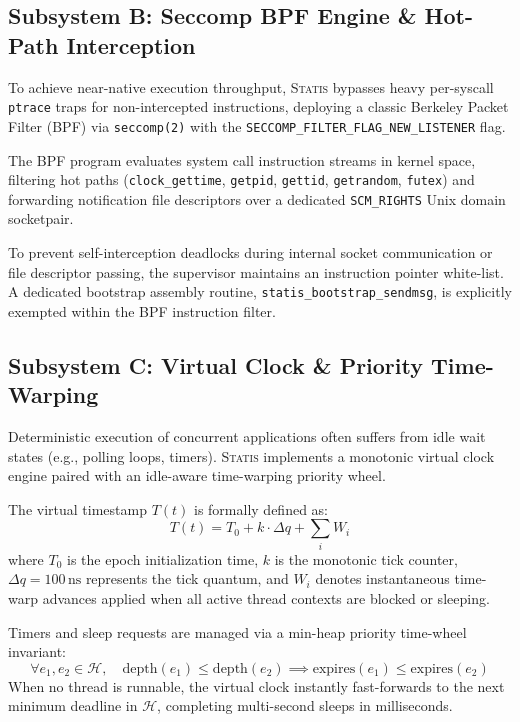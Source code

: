 \documentclass[twocolumn,10pt,sigconf,nonacm]{acmart}
\begin{document}
\subsection{Subsystem B: Seccomp BPF Engine \& Hot-Path Interception}
To achieve near-native execution throughput, \textsc{Statis} bypasses heavy per-syscall \texttt{ptrace} traps for non-intercepted instructions, deploying a classic Berkeley Packet Filter (BPF) via \texttt{seccomp(2)} with the \texttt{SECCOMP\_FILTER\_FLAG\_NEW\_LISTENER} flag.

The BPF program evaluates system call instruction streams in kernel space, filtering hot paths (\texttt{clock\_gettime}, \texttt{getpid}, \texttt{gettid}, \texttt{getrandom}, \texttt{futex}) and forwarding notification file descriptors over a dedicated \texttt{SCM\_RIGHTS} Unix domain socketpair. 

To prevent self-interception deadlocks during internal socket communication or file descriptor passing, the supervisor maintains an instruction pointer white-list. A dedicated bootstrap assembly routine, \texttt{statis\_bootstrap\_sendmsg}, is explicitly exempted within the BPF instruction filter.

\subsection{Subsystem C: Virtual Clock \& Priority Time-Warping}
Deterministic execution of concurrent applications often suffers from idle wait states (e.g., polling loops, timers). \textsc{Statis} implements a monotonic virtual clock engine paired with an idle-aware time-warping priority wheel.

The virtual timestamp $T(t)$ is formally defined as:
\begin{equation}
T(t) = T_0 + k \cdot \Delta q + \sum_{i} W_i
\end{equation}
where $T_0$ is the epoch initialization time, $k$ is the monotonic tick counter, $\Delta q = 100\,\text{ns}$ represents the tick quantum, and $W_i$ denotes instantaneous time-warp advances applied when all active thread contexts are blocked or sleeping.

Timers and sleep requests are managed via a min-heap priority time-wheel invariant:
\begin{equation}
\forall e_1, e_2 \in \mathcal{H},\quad \text{depth}(e_1) \le \text{depth}(e_2) \implies \text{expires}(e_1) \le \text{expires}(e_2)
\end{equation}
When no thread is runnable, the virtual clock instantly fast-forwards to the next minimum deadline in $\mathcal{H}$, completing multi-second sleeps in milliseconds.
\end{document}
